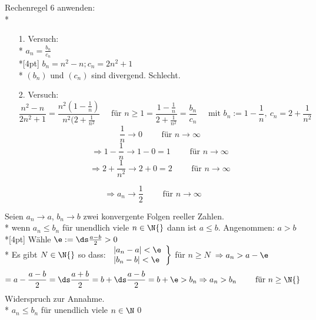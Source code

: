 Rechenregel 6 anwenden:\\*
\begin{itemize}
\item[1.]{Versuch:\\*
$a_n = \frac{b_n}{c_n}$\\*[4pt]
$b_n = n^2 -n; c_n = 2n^2 + 1$\\*
$(b_n)$ und $(c_n)$ sind divergend. Schlecht.}
\item[2.]{Versuch:
$$\frac{n^2 - n}{2n^2 + 1} = \frac{n^2(1 - \frac{1}{n})}{n^2(2 + \frac{1}{n^2}}\quad\text{ für }n \geq 1= \frac{1-\frac{1}{n}}{2 +\frac{1}{n^2}}=\frac{b_n}{c_n}\quad\text{ mit }b_n:=1-\frac{1}{n},\ c_n = 2 + \frac{1}{n^2}$$
$$\frac{1}{n} \to 0\qquad\text{ für }n \to ∞ $$
$$\Rightarrow 1 - \frac{1}{n} \to 1 - 0 = 1\qquad\text{ für }n \to ∞$$
$$\Rightarrow 2 +\frac{1}{n^2}\to 2 + 0 = 2\qquad\text{ für }n \to ∞$$}
\end{itemize}
$$\Rightarrow a_n \to \frac{1}{2}\qquad\text{ für }n \to ∞$$

Seien $a_n \to a$, $b_n \to b$ zwei konvergente Folgen reeller Zahlen.\\*
wenn $a_n \leq b_n$ für unendlich viele $n \in \N{}$ dann ist $a \leq b$.
\bew
Angenommen: $a > b$\\*[4pt]
Wähle $\e := \ds\frac{a - b}{2} > 0$\\*
Es gibt $N \in \N{}$ so dass:
$\left.
\begin{array}{ll}
| a_n - a | < \e \\*
| b_n - b | < \e
\end{array} \right\rbrace$ für $n \geq N$\ $\Rightarrow a_n > a - \e$
$$= a - \frac{a - b}{2} = \ds\frac{a + b}{2} = b + \ds\frac{a - b}{2}= b + \e > b_n \Rightarrow a_n > b_n\qquad\text{ für }n \geq \N{}$$
Widerspruch zur Annahme.\\*
$a_n \leq b_n$ für unendlich viele $n \in \N$\qed

